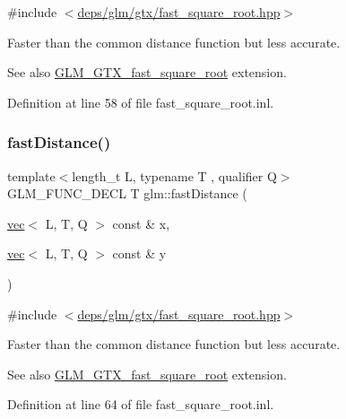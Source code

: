{\ttfamily \#include $<$\hyperlink{fast__square__root_8hpp}{deps/glm/gtx/fast\+\_\+square\+\_\+root.\+hpp}$>$}

Faster than the common distance function but less accurate.

\begin{DoxySeeAlso}{See also}
\hyperlink{group__gtx__fast__square__root}{G\+L\+M\+\_\+\+G\+T\+X\+\_\+fast\+\_\+square\+\_\+root} extension. 
\end{DoxySeeAlso}


Definition at line 58 of file fast\+\_\+square\+\_\+root.\+inl.

\mbox{\label{group__gtx__fast__square__root_ga42d3e771fa7cb3c60d828e315829df19}} 
\subsubsection{\texorpdfstring{fast\+Distance()}{fastDistance()}\hspace{0.1cm}{\footnotesize\ttfamily [2/2]}}
{\footnotesize\ttfamily template$<$length\+\_\+t L, typename T , qualifier Q$>$ \\
G\+L\+M\+\_\+\+F\+U\+N\+C\+\_\+\+D\+E\+CL T glm\+::fast\+Distance (\begin{DoxyParamCaption}\item[{\hyperlink{structglm_1_1vec}{vec}$<$ L, T, Q $>$ const \&}]{x,  }\item[{\hyperlink{structglm_1_1vec}{vec}$<$ L, T, Q $>$ const \&}]{y }\end{DoxyParamCaption})}



{\ttfamily \#include $<$\hyperlink{fast__square__root_8hpp}{deps/glm/gtx/fast\+\_\+square\+\_\+root.\+hpp}$>$}

Faster than the common distance function but less accurate.

\begin{DoxySeeAlso}{See also}
\hyperlink{group__gtx__fast__square__root}{G\+L\+M\+\_\+\+G\+T\+X\+\_\+fast\+\_\+square\+\_\+root} extension. 
\end{DoxySeeAlso}


Definition at line 64 of file fast\+\_\+square\+\_\+root.\+inl.


